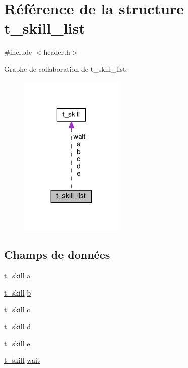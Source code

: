 \hypertarget{structt__skill__list}{\section{Référence de la structure t\-\_\-skill\-\_\-list}
\label{structt__skill__list}
}


{\ttfamily \#include $<$header.\-h$>$}



Graphe de collaboration de t\-\_\-skill\-\_\-list\-:\nopagebreak
\begin{figure}[H]
\begin{center}
\leavevmode
\includegraphics[width=140pt]{structt__skill__list__coll__graph}
\end{center}
\end{figure}
\subsection*{Champs de données}
\begin{DoxyCompactItemize}
\item 
\hyperlink{structt__skill}{t\-\_\-skill} \hyperlink{structt__skill__list_a39a494bb9ce01ba13ea4577fe2b1cc79}{a}
\item 
\hyperlink{structt__skill}{t\-\_\-skill} \hyperlink{structt__skill__list_a85ae40dbaecefd131b936ec65e9f4809}{b}
\item 
\hyperlink{structt__skill}{t\-\_\-skill} \hyperlink{structt__skill__list_ac9055dd2d5c45c223e3b0e1920c31493}{c}
\item 
\hyperlink{structt__skill}{t\-\_\-skill} \hyperlink{structt__skill__list_a0bb2c4a26ff65aecd7a36ad7ee898cd8}{d}
\item 
\hyperlink{structt__skill}{t\-\_\-skill} \hyperlink{structt__skill__list_aa756d3dbc91762775cff0f4b52526a70}{e}
\item 
\hyperlink{structt__skill}{t\-\_\-skill} \hyperlink{structt__skill__list_a2a4af1a4acb8da6061990f9bd8d0a564}{wait}
\end{DoxyCompactItemize}


